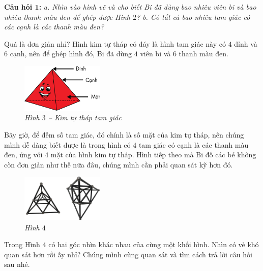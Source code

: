 	\textbf{Câu hỏi $\pmb{1}$:} \textit{a. Nhìn vào hình vẽ và cho biết Bi đã dùng bao nhiêu viên bi và bao nhiêu thanh màu đen để ghép được Hình $2$?
	\vskip 0.1cm
	b. Có tất cả bao nhiêu tam giác có các cạnh là các thanh màu đen? }
	\begin{multicols}{2}
		Quá là đơn giản nhỉ? Hình kim tự tháp có đáy là hình tam giác này có $4$ đỉnh và $6$ cạnh, nên để ghép hình đó, Bi đã dùng $4$ viên bi và $6$ thanh màu đen.
		\begin{figure}[H]
			\centering
			\vspace*{5pt}
			\captionsetup{labelformat= empty, justification=centering}
			\includegraphics[width=0.35\textwidth]{3}
			\caption{\small\textit{Hình $3$ -- Kim tự tháp tam giác}}
			\vspace*{-5pt}
		\end{figure}
	\end{multicols}	
	Bây giờ, để đếm số tam giác, đó chính là số mặt của kim tự tháp, nên chúng mình dễ dàng biết được là trong hình có $4$ tam giác có cạnh là các thanh màu đen, ứng với $4$ mặt của hình kim tự tháp.
	\vskip 0.1cm
	Hình tiếp theo mà Bi đố các bé không còn đơn giản như thế nữa đâu, chúng mình cần phải quan sát kỹ hơn đó.
	\vspace*{-5pt}
	\begin{multicols}{2}
		\begin{figure}[H]
			\centering
			\vspace*{5pt}
			\captionsetup{labelformat= empty, justification=centering} \includegraphics[width=0.35\textwidth]{4}
			\caption{\small\textit{Hình $4$}}
			\vspace*{-5pt}
		\end{figure}
		Trong Hình $4$ có hai góc nhìn khác nhau của cùng một khối hình. Nhìn có vẻ khó quan sát hơn rồi ấy nhỉ? Chúng mình cùng quan sát và tìm cách trả lời câu hỏi sau nhé.
	\end{multicols}
	\vspace*{-5pt}
